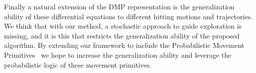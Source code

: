 \documentclass[10pt,a4paper]{article}
\begin{document}
Finally a natural extension of the DMP representation is the generalization ability of these differential equations to different hitting motions and trajectories. We think that with our method, a stochastic approach to guide exploration is missing, and it is this that restricts the generalization ability of the proposed algorithm. By extending our framework to include the Probabilistic Movement Primitives~\cite{Paraschos13} we hope to increase the generalization ability and leverage the probabilistic logic of these movement primitives.


%
%

\end{document}
